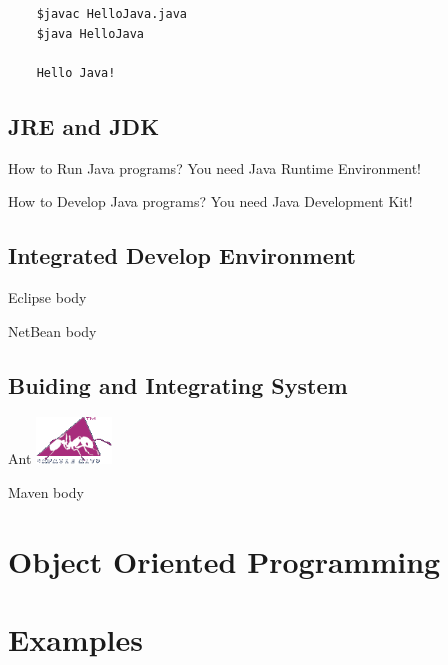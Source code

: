 \documentclass[UTF8]{beamer}
\begin{document}
\begin{frame}[fragile]
  \begin{verbatim}
    $javac HelloJava.java
    $java HelloJava

    Hello Java!
  \end{verbatim}
\end{frame}

\subsection{JRE and JDK}
\begin{frame}{How to Run Java programs?}
  You need Java Runtime Environment!
\end{frame}

\begin{frame}{How to Develop Java programs?}
  You need Java Development Kit!
\end{frame}

\subsection{Integrated Develop Environment}
\begin{frame}[t]{Eclipse}
  body
\end{frame}

\begin{frame}[t]{NetBean}
  body
\end{frame}

\subsection{Buiding and Integrating System}

\begin{frame}[t]{Ant}
\includegraphics[width=2cm]{ant.png}
\end{frame}

\begin{frame}[t]{Maven}
  body
\end{frame}

\section{Object Oriented Programming}



\section{Examples}
\end{document}
